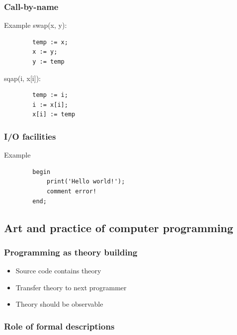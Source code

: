 \documentclass{beamer}
\begin{document}
\begin{frame}[fragile]
	\frametitle{Call-by-name}
	
	\begin{exampleblock}{Example}
		swap(x, y):
		\begin{lstlisting}
		temp := x;
		x := y;
		y := temp
		\end{lstlisting}
		sqap(i, x[i]):
		\begin{lstlisting}
		temp := i;
		i := x[i];
		x[i] := temp
		\end{lstlisting}
	\end{exampleblock}
\end{frame}

\begin{frame}[fragile]
	\frametitle{I/O facilities}
	\begin{exampleblock}{Example}
		\begin{lstlisting}
		begin
		    print('Hello world!'); 
		    comment error!
		end;
		\end{lstlisting}
	\end{exampleblock}
\end{frame}


\subsection{Art and practice of computer programming}

\begin{frame} %
\frametitle{Programming as theory building}
	\begin{itemize}
		\item Source code contains theory
		\item Transfer theory to next programmer
		\item Theory should be observable
	\end{itemize}
\end{frame}

\begin{frame} %
	\frametitle{Role of formal descriptions}
	\begin{center}
	\end{center}
\end{frame}
\end{document}
